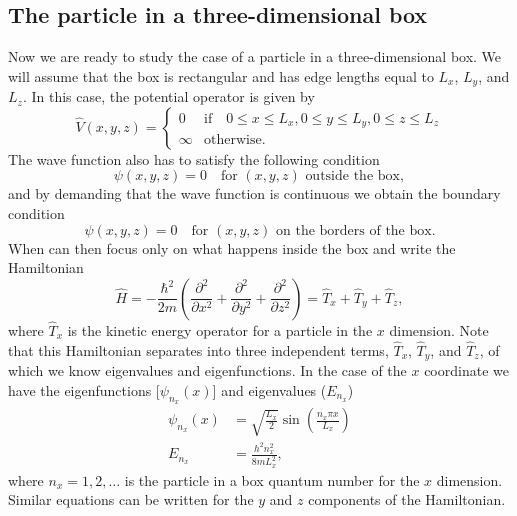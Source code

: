 \subsection{The particle in a three-dimensional box}
Now we are ready to study the case of a particle in a three-dimensional box.
We will assume that the box is rectangular and has edge lengths equal to $L_x$, $L_y$, and $L_z$.
In this case, the potential operator is given by
\begin{equation}
\hat{V}(x,y,z)  =
\begin{cases}
0 & \text{if}\quad 0 \leq x \leq L_x, 0 \leq y \leq L_y, 0 \leq z \leq L_z \\
\infty & \text{otherwise}.
\end{cases}
\end{equation}
The wave function also has to satisfy the following condition
\begin{equation}
\psi(x,y,z) = 0 \quad \text{for } (x,y,z) \text{ outside the box},
\end{equation}
and by demanding that the wave function is continuous we obtain the boundary condition
\begin{equation}
\psi(x,y,z) = 0 \quad \text{for } (x,y,z) \text{ on the borders of the box}.
\end{equation}
When can then focus only on what happens inside the box and write the Hamiltonian
\begin{equation}
\hat{H} = -\frac{\hbar^2}{2m}
\left(\frac{\partial^2}{\partial x^2} + \frac{\partial^2}{\partial y^2} + \frac{\partial^2}{\partial z^2} \right) = \hat{T}_x + \hat{T}_y + \hat{T}_z,
\end{equation}
where $\hat{T}_x$ is the kinetic energy operator for a particle in the $x$ dimension.
Note that this Hamiltonian separates into three independent terms,  $\hat{T}_x$, $\hat{T}_y$, and $\hat{T}_z$, of which we know eigenvalues and eigenfunctions.
In the case of the $x$ coordinate we have the eigenfunctions [$\psi_{n_x}(x)$] and eigenvalues ($E_{n_x}$)
\begin{equation}
\begin{split}
\psi_{n_x}(x) &= \sqrt{\frac{L_x}{2}} \sin \left(\frac{n_x \pi x}{L_x}\right) \\
E_{n_x} &= \frac{h^2 n_x^2}{8mL_x^2},
\end{split}
\end{equation}
where $n_x = 1, 2, \ldots$ is the particle in a box quantum number for the $x$ dimension.
Similar equations can be written for the $y$ and $z$ components of the Hamiltonian.

